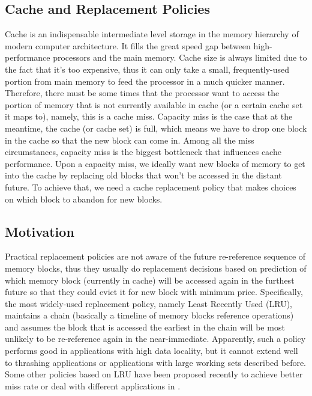 \documentclass[conference]{IEEEtran}
\begin{document}
\subsection{Cache and Replacement Policies}
Cache is an indispensable intermediate level storage in the memory hierarchy of modern computer architecture. It fills the great speed gap between high-performance processors and the main memory. Cache size is always limited due to the fact that it's too expensive, thus it can only take a small, frequently-used portion from main memory to feed the processor in a much quicker manner. Therefore, there must be some times that the processor want to access the portion of memory that is not currently available in cache (or a certain cache set it maps to), namely, this is a cache miss. Capacity miss is the case that at the meantime, the cache (or cache set) is full, which means we have to drop one block in the cache so that the new block can come in. Among all the miss circumstances, capacity miss is the biggest bottleneck that influences cache performance. Upon a capacity miss, we ideally want new blocks of memory to get into the cache by replacing old blocks that won't be accessed in the distant future. To achieve that, we need a cache replacement policy that makes choices on which block to abandon for new blocks.
\subsection{Motivation}
Practical replacement policies are not aware of the future re-reference sequence of memory blocks, thus they usually do replacement decisions based on prediction of which memory block (currently in cache) will be accessed again in the furthest future so that they could evict it for new block with minimum price. Specifically, the most widely-used replacement policy, namely Least Recently Used (LRU), maintains a chain (basically a timeline of memory blocks reference operations) and assumes the block that is accessed the earliest in the chain will be most unlikely to be re-reference again in the near-immediate. Apparently, such a policy performs good in applications with high data locality, but it cannot extend well to thrashing applications or applications with large working sets described before. Some other policies based on LRU have been proposed recently to achieve better miss rate or deal with different applications in \cite{jaleel2008adaptive} \cite{qureshi2007adaptive} \cite{srinath2007feedback} \cite{xie2009pipp}. 
\end{document}

